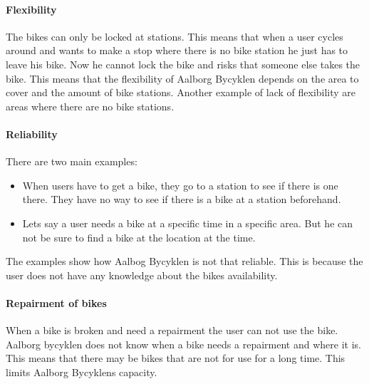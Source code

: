 \paragraph{Flexibility}
The bikes can only be locked at stations.
This means that when a user cycles around and wants to make a stop where there is no bike station he just has to leave his bike.
Now he cannot lock the bike and risks that someone else takes the bike.
This means that the flexibility of Aalborg Bycyklen depends on the area to cover and the amount of bike stations.
Another example of lack of flexibility are areas where there are no bike stations.


\paragraph{Reliability}
There are two main examples:
\begin{itemize}
\item When users have to get a bike, they go to a station to see if there is one there.
They have no way to see if there is a bike at a station beforehand.
\item Lets say a user needs a bike at a specific time in a specific area.
But he can not be sure to find a bike at the location at the time.
\end{itemize}
The examples show how Aalbog Bycyklen is not that reliable.
This is because the user does not have any knowledge about the bikes availability.

\paragraph{Repairment of bikes}
When a bike is broken and need a repairment the user can not use the bike.
Aalborg bycyklen does not know when a bike needs a repairment and where it is.
This means that there may be bikes that are not for use for a long time.
This limits Aalborg Bycyklens capacity.